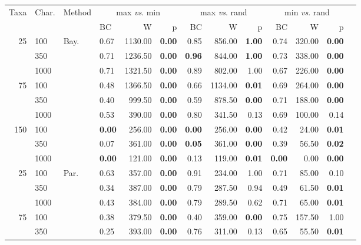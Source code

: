 \documentclass[12pt,letterpaper]{article}
\begin{document}
\begin{table}[ht]
\centering
\begin{tabular}{rlllrrrrrrrrr}
  \hline
Taxa & Char. & Method & \multicolumn{3}{c}{max \textit{vs}. min} & \multicolumn{3}{c}{max \textit{vs}. rand} & \multicolumn{3}{c}{min \textit{vs}. rand} \\
 & & & BC & W & p & BC & W & p & BC & W & p \\ 
  \hline
25 & 100 & Bay. & 0.67 & 1130.00 & \textbf{0.00} & 0.85 & 856.00 & \textbf{1.00} & 0.74 & 320.00 & \textbf{0.00} \\ 
   & 350 &   & 0.71 & 1236.50 & \textbf{0.00} & \textbf{0.96} & 844.00 & \textbf{1.00} & 0.73 & 338.00 & \textbf{0.00} \\ 
   & 1000 &   & 0.71 & 1321.50 & \textbf{0.00} & 0.89 & 802.00 & 1.00 & 0.67 & 226.00 & \textbf{0.00} \\ 
75 & 100 &   & 0.48 & 1366.50 & \textbf{0.00} & 0.66 & 1134.00 & \textbf{0.01} & 0.69 & 264.00 & \textbf{0.00} \\ 
   & 350 &   & 0.40 & 999.50 & \textbf{0.00} & 0.59 & 878.50 & \textbf{0.00} & 0.71 & 188.00 & \textbf{0.00} \\ 
   & 1000 &   & 0.53 & 390.00 & \textbf{0.00} & 0.80 & 341.50 & 0.13 & 0.69 & 100.00 & 0.14 \\ 
150 & 100 &   & \textbf{0.00} & 256.00 & \textbf{0.00} & \textbf{0.00} & 256.00 & \textbf{0.00} & 0.42 & 24.00 & \textbf{0.01} \\ 
    & 350 &   & 0.07 & 361.00 & \textbf{0.00} & \textbf{0.05} & 361.00 & \textbf{0.00} & 0.39 & 56.50 & \textbf{0.02} \\ 
    & 1000 &   & \textbf{0.00} & 121.00 & \textbf{0.00} & 0.13 & 119.00 & \textbf{0.01} & \textbf{0.00} & 0.00 & \textbf{0.00} \\ 
25 & 100 & Par. & 0.63 & 357.00 & \textbf{0.00} & 0.91 & 234.00 & 1.00 & 0.71 & 85.00 & 0.10 \\ 
   & 350 &   & 0.34 & 387.00 & \textbf{0.00} & 0.79 & 287.50 & 0.94 & 0.49 & 61.50 & \textbf{0.01} \\ 
   & 1000 &  & 0.43 & 384.00 & \textbf{0.00} & 0.79 & 289.50 & 0.62 & 0.71 & 65.00 & \textbf{0.01} \\ 
75 & 100 &   & 0.38 & 379.50 & \textbf{0.00} & 0.40 & 359.00 & \textbf{0.00} & 0.75 & 157.50 & 1.00 \\ 
   & 350 &   & 0.25 & 393.00 & \textbf{0.00} & 0.76 & 311.00 & 0.13 & 0.65 & 55.50 & \textbf{0.01} \\ 

\end{tabular}
\end{table}
\end{document}
